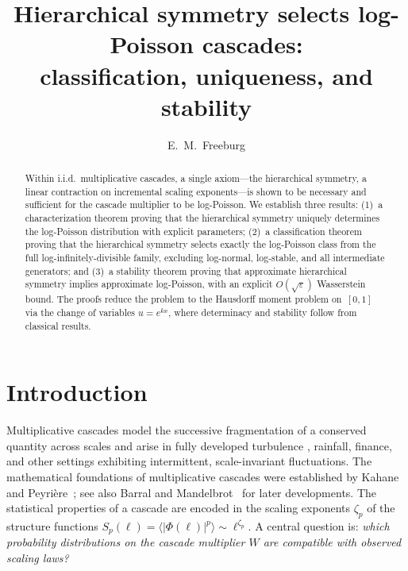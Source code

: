 \documentclass[12pt]{amsart}
\theoremstyle{definition}
\theoremstyle{remark}
\begin{document}
\title[Hierarchical symmetry selects log-Poisson cascades]%
{Hierarchical symmetry selects log-Poisson cascades: \\
classification, uniqueness, and stability}

\author{E.~M.~Freeburg}
\address{Independent Researcher}
\date{}

\begin{abstract}
Within i.i.d.\ multiplicative cascades, a single axiom---the
hierarchical symmetry, a linear contraction on incremental scaling
exponents---is shown to be necessary and sufficient for the cascade
multiplier to be log-Poisson.  We establish three results:
(1)~a characterization theorem proving that the hierarchical symmetry
uniquely determines the log-Poisson distribution with explicit
parameters; (2)~a classification theorem proving that the hierarchical
symmetry selects exactly the log-Poisson class from the full
log-infinitely-divisible family, excluding log-normal, log-stable, and
all intermediate generators; and (3)~a stability theorem proving that
approximate hierarchical symmetry implies approximate log-Poisson,
with an explicit $O(\sqrt{\varepsilon})$ Wasserstein bound.  The
proofs reduce the problem to the Hausdorff moment problem on~$[0,1]$
via the change of variables $u = e^{kx}$, where determinacy and
stability follow from classical results.
\end{abstract}

\maketitle

\section{Introduction}

Multiplicative cascades model the successive fragmentation of a
conserved quantity across scales and arise in fully developed
turbulence \cite{K62,Man74}, rainfall, finance, and other settings
exhibiting intermittent, scale-invariant fluctuations.  The
mathematical foundations of multiplicative cascades were established
by Kahane and Peyri\`ere~\cite{KP76}; see also Barral and
Mandelbrot~\cite{BM02} for later developments.  The statistical
properties of a cascade are encoded in the scaling exponents
$\zeta_p$ of the structure functions $S_p(\ell) = \langle
|\Phi(\ell)|^p \rangle \sim \ell^{\zeta_p}$.  A central question is:
\emph{which probability distributions on the cascade multiplier $W$
are compatible with observed scaling laws?}
\end{document}
